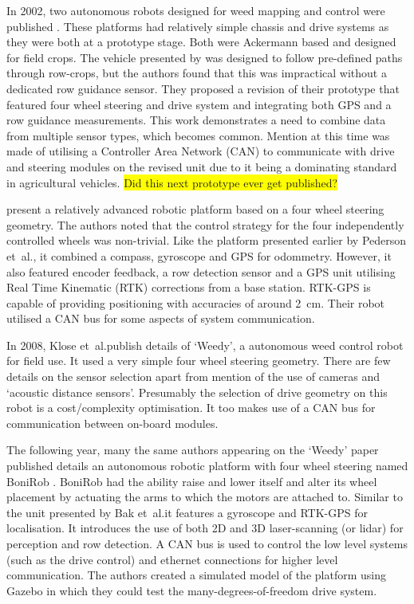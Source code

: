 \documentclass[preprint,authoryear,12pt]{elsarticle}
\begin{document}
        In 2002, two autonomous robots designed for weed mapping and control were published \citep{Pedersen2002,Astrand2002}.
        These platforms had relatively simple chassis and drive systems as they were both at a prototype stage.
        Both were Ackermann based and designed for field crops.
        The vehicle presented by \cite{Pedersen2002} was designed to follow pre-defined paths through row-crops, but the authors found that this was impractical without a dedicated row guidance sensor.
        They proposed a revision of their prototype that featured four wheel steering and drive system and integrating both GPS and a row guidance measurements.
        This work demonstrates a need to combine data from multiple sensor types, which becomes common.
        Mention at this time was made of utilising a Controller Area Network (CAN) to communicate with drive and steering modules on the revised unit due to it being a dominating standard in agricultural vehicles.
        \colorbox{yellow}{Did this next prototype ever get published?}
        
        \cite{Bak2004} present a relatively advanced robotic platform based on a four wheel steering geometry.
        The authors noted that the control strategy for the four independently controlled wheels was non-trivial.
        Like the platform presented earlier by Pederson et~al.\@, it combined a compass, gyroscope and GPS for odommetry.
        However, it also featured encoder feedback, a row detection sensor and a GPS unit utilising Real Time Kinematic (RTK) corrections from a base station.
        RTK-GPS is capable of providing positioning with accuracies of around \SI{2}{\centi\meter}.
        Their robot utilised a CAN bus for some aspects of system communication.

        In 2008, Klose et~al.\@ publish details of `Weedy', a autonomous weed control robot for field use.
        It used a very simple four wheel steering geometry.
        There are few details on the sensor selection apart from mention of the use of cameras and `acoustic distance sensors'.
        Presumably the selection of drive geometry on this robot is a cost/complexity optimisation.
        It too makes use of a CAN bus for communication between on-board modules.

        The following year, many the same authors appearing on the `Weedy' paper published details an autonomous robotic platform with four wheel steering named BoniRob \citep{Ruckelshausen2009}.
        BoniRob had the ability raise and lower itself and alter its wheel placement by actuating the arms to which the motors are attached to.
        Similar to the unit presented by Bak et~al.\@ it features a gyroscope and RTK-GPS for localisation.
        It introduces the use of both 2D and 3D laser-scanning (or lidar) for perception and row detection.
        A CAN bus is used to control the low level systems (such as the drive control) and ethernet connections for higher level communication.
        The authors created a simulated model of the platform using Gazebo in which they could test the many-degrees-of-freedom drive system.
\end{document}
